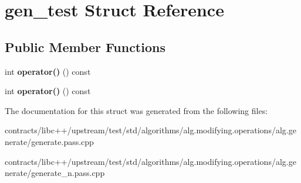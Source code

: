 \hypertarget{structgen__test}{}\section{gen\+\_\+test Struct Reference}
\label{structgen__test}
\subsection*{Public Member Functions}
\begin{DoxyCompactItemize}
\item 
\mbox{\label{structgen__test_ab7bd7f653fc5f78cb6992ae0162358d6}} 
int {\bfseries operator()} () const
\item 
\mbox{\label{structgen__test_ab7bd7f653fc5f78cb6992ae0162358d6}} 
int {\bfseries operator()} () const
\end{DoxyCompactItemize}


The documentation for this struct was generated from the following files\+:\begin{DoxyCompactItemize}
\item 
contracts/libc++/upstream/test/std/algorithms/alg.\+modifying.\+operations/alg.\+generate/generate.\+pass.\+cpp\item 
contracts/libc++/upstream/test/std/algorithms/alg.\+modifying.\+operations/alg.\+generate/generate\+\_\+n.\+pass.\+cpp\end{DoxyCompactItemize}
